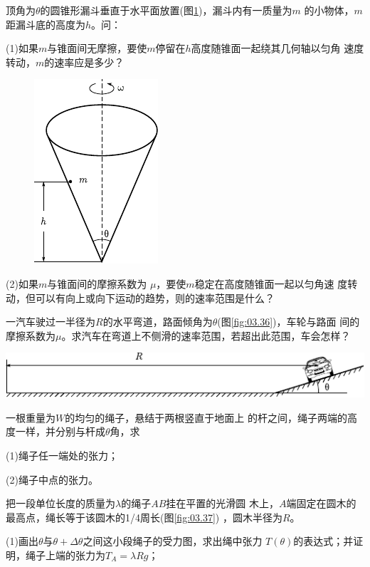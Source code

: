 \begin{exercises}
\exercise 顶角为$ \theta $的圆锥形漏斗垂直于水平面放置(图\ref{fig:03.35})，漏斗内有一质量为$ m $
的小物体，$ m $距漏斗底的高度为$ h $。问：

(1)如果$ m $与锥面间无摩擦，要使$ m $停留在$ h $高度随锥面一起绕其几何轴以匀角
速度转动，$ m $的速率应是多少？

\begin{figure}
	\vspace{-3.12em}
	\centering
	\includegraphics{figure/fig03.35}
	\caption{}
	\label{fig:03.35}
\end{figure}
(2)如果$ m $与锥面间的摩擦系数为 $\mu$，要使$ m $稳定在高度随锥面一起以匀角速
度转动，但可以有向上或向下运动的趋势，则的速率范围是什么？

\exercise 一汽车驶过一半径为$ R $的水平弯道，路面倾角为$ \theta $(图\ref{fig:03.36})，车轮与路面
间的摩擦系数为$ \mu $。求汽车在弯道上不侧滑的速率范围，若超出此范围，车会怎样？
\begin{figurex}
	\centering
	\includegraphics{figure/fig03.36}
	\caption{}
	\label{fig:03.36}
\end{figurex}
\exercise 一根重量为$ W $的均匀的绳子，悬结于两根竖直于地面上
的杆之间，绳子两端的高度一样，并分别与杆成$ \theta $角，求

(1)绳子任一端处的张力；

(2)绳子中点的张力。

\exercise 把一段单位长度的质量为$ \lambda $的绳子$ AB $挂在平置的光滑圆
木上，$ A $端固定在圆木的最高点，绳长等于该圆木的1/4周长(图\ref{fig:03.37}) ，圆木半径为$ R $。

(1)画出$ \theta $与$ \theta + \Delta \theta$之间这小段绳子的受力图，求出绳中张力
$ T (\theta) $的表达式；并证明，绳子上端的张力为$  T _ { A } = \lambda R g  $；


\end{exercises}
